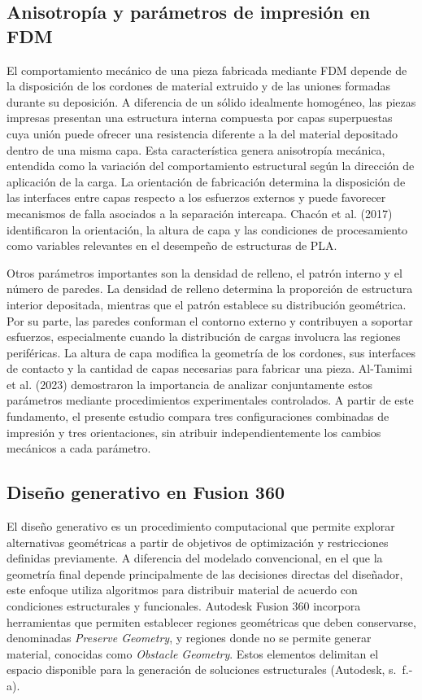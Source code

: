 \documentclass[10pt,twocolumn]{article}
\begin{document}
\subsection{Anisotropía y parámetros de impresión en FDM}
El comportamiento mecánico de una pieza fabricada mediante FDM depende de la disposición de los cordones de material extruido y de las uniones formadas durante su deposición. A diferencia de un sólido idealmente homogéneo, las piezas impresas presentan una estructura interna compuesta por capas superpuestas cuya unión puede ofrecer una resistencia diferente a la del material depositado dentro de una misma capa. Esta característica genera anisotropía mecánica, entendida como la variación del comportamiento estructural según la dirección de aplicación de la carga. La orientación de fabricación determina la disposición de las interfaces entre capas respecto a los esfuerzos externos y puede favorecer mecanismos de falla asociados a la separación intercapa. Chacón et al. (2017) identificaron la orientación, la altura de capa y las condiciones de procesamiento como variables relevantes en el desempeño de estructuras de PLA.

Otros parámetros importantes son la densidad de relleno, el patrón interno y el número de paredes. La densidad de relleno determina la proporción de estructura interior depositada, mientras que el patrón establece su distribución geométrica. Por su parte, las paredes conforman el contorno externo y contribuyen a soportar esfuerzos, especialmente cuando la distribución de cargas involucra las regiones periféricas. La altura de capa modifica la geometría de los cordones, sus interfaces de contacto y la cantidad de capas necesarias para fabricar una pieza. Al-Tamimi et al. (2023) demostraron la importancia de analizar conjuntamente estos parámetros mediante procedimientos experimentales controlados. A partir de este fundamento, el presente estudio compara tres configuraciones combinadas de impresión y tres orientaciones, sin atribuir independientemente los cambios mecánicos a cada parámetro.
\subsection{Diseño generativo en Fusion 360}
El diseño generativo es un procedimiento computacional que permite explorar alternativas geométricas a partir de objetivos de optimización y restricciones definidas previamente. A diferencia del modelado convencional, en el que la geometría final depende principalmente de las decisiones directas del diseñador, este enfoque utiliza algoritmos para distribuir material de acuerdo con condiciones estructurales y funcionales. Autodesk Fusion 360 incorpora herramientas que permiten establecer regiones geométricas que deben conservarse, denominadas \textit{Preserve Geometry}, y regiones donde no se permite generar material, conocidas como \textit{Obstacle Geometry}. Estos elementos delimitan el espacio disponible para la generación de soluciones estructurales (Autodesk, s.~f.-a).
\end{document}
